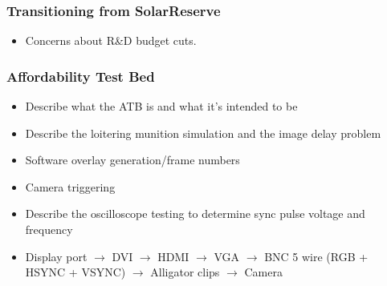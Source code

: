 \documentclass[aspectratio=169]{beamer}
\begin{document}
\begin{frame}
  \frametitle{Transitioning from SolarReserve}
  \begin{itemize}
  \item Concerns about R\&D budget cuts.
  \end{itemize}
\end{frame}

\begin{frame}
  \frametitle{Affordability Test Bed}
  \begin{itemize}
  \item Describe what the ATB is and what it's intended to be
  \item Describe the loitering munition simulation and the image delay problem
  \item Software overlay generation/frame numbers
  \item Camera triggering
  \item Describe the oscilloscope testing to determine sync pulse voltage and frequency
  \item Display port $\rightarrow$ DVI $\rightarrow$ HDMI $\rightarrow$ VGA $\rightarrow$ BNC 5 wire (RGB + HSYNC + VSYNC) $\rightarrow$ Alligator clips $\rightarrow$ Camera
  \end{itemize}
\end{frame}
\end{document}
